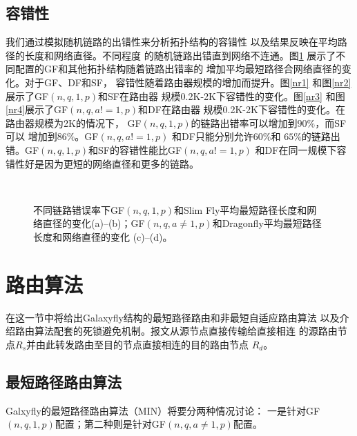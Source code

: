 \subsection{容错性}

我们通过模拟随机链路的出错性来分析拓扑结构的容错性
以及结果反映在平均路径的长度和网络直径。不同程度
的随机链路出错直到网络不连通。图\ref{fig:Figure8}
展示了不同配置的GF和其他拓扑结构随着链路出错率的
增加平均最短路径合网络直径的变化。对于GF、DF和SF，
容错性随着路由器规模的增加而提升。图\ref{nr1}
和图\ref{nr2}展示了GF$(n,q,1,p)$和SF在路由器
规模0.2K-2K下容错性的变化。图\ref{nr3}
和图\ref{nr4}展示了GF$(n,q,a!=1,p)$和DF在路由器
规模0.2K-2K下容错性的变化。在路由器规模为2K的情况下，
GF$(n,q,1,p)$的链路出错率可以增加到$90\%$，而SF可以
增加到$86\%$。GF$(n,q,a!=1,p)$ 和DF只能分别允许$60\%$和
$65\%$的链路出错。GF$(n,q,1,p)$和SF的容错性能比GF$(n,q,a!=1,p)$
和DF在同一规模下容错性好是因为更短的网络直径和更多的链路。


\begin{figure}[t]
  \centering
  \begin{minipage}[t]{\textwidth}
   \centering
   \\
  \caption{ 不同链路错误率下GF$(n,q,1,p)$和Slim Fly平均最短路径长度和网络直径的变化(a)--(b)；GF$(n,q,a\neq1,p)$和Dragonfly平均最短路径长度和网络直径的变化 (c)--(d)。}
  \label{fig:Figure8}
   \end{minipage}
\end{figure}


\section{路由算法}

在这一节中将给出Galaxyfly结构的最短路径路由和非最短自适应路由算法
以及介绍路由算法配套的死锁避免机制。报文从源节点直接传输给直接相连
的源路由节点$R_s$并由此转发路由至目的节点直接相连的目的路由节点
$R_d$。

\subsection{最短路径路由算法}

Galxyfly的最短路径路由算法（MIN）将要分两种情况讨论：
一是针对GF$(n,q,1,p)$配置；第二种则是针对GF$(n,q,a\neq 1,p)$配置。

